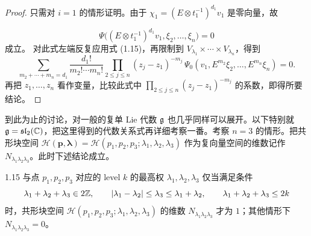 \begin{proof}
只需对 $i=1$ 的情形证明。由于 $\chi_1=(E\otimes t_1^{-1})^{d_1}v_1$ 是零向量，故

\[
  \Psi\bigl((E\otimes t_1^{-1})^{d_1}v_1,\xi_2,\dots,\xi_n\bigr)=0
\]
成立。
对此式左端反复应用式 (1.15)，再限制到 $V_{\lambda_1}\times\cdots\times V_{\lambda_n}$，得到
\[
  \sum_{m_2+\cdots+m_n=d_1}\frac{d_1!}{m_2!\cdots m_n!}
  \prod_{2\le j\le n}(z_j-z_1)^{-m_j}\,
  \Psi_0(v_1,E^{m_2}\xi_2,\dots,E^{m_n}\xi_n)=0 .
\]
再把 $z_1,\dots,z_n$ 看作变量，比较此式中 $\prod_{2\le j\le n}(z_j-z_1)^{-m_j}$ 的系数，即得所要结论。
\end{proof}


到此为止的讨论，对一般的复单 Lie 代数 $\mathfrak{g}$ 也几乎同样可以展开。以下特别就 $\mathfrak{g}=\mathfrak{sl}_2(\mathbb{C})$，把这里得到的代数关系式再详细考察一番。考察 $n=3$ 的情形。把共形块空间 $\mathcal{H}(\bm p,\bm\lambda)=\mathcal{H}(p_1,p_2,p_3;\lambda_1,\lambda_2,\lambda_3)$ 作为复向量空间的维数记作 $N_{\lambda_1\lambda_2\lambda_3}$。此时下述结论成立。

\begin{proposition*}{1.15}
与点 $p_1,p_2,p_3$ 对应的 level $k$ 的最高权 $\lambda_1,\lambda_2,\lambda_3$ 仅当满足条件
\[
  \lambda_1+\lambda_2+\lambda_3\in2\mathbb{Z},\qquad
  |\lambda_1-\lambda_2|\le\lambda_3\le\lambda_1+\lambda_2,\qquad
  \lambda_1+\lambda_2+\lambda_3\le2k
\]
时，共形块空间 $\mathcal{H}(p_1,p_2,p_3;\lambda_1,\lambda_2,\lambda_3)$ 的维数 $N_{\lambda_1\lambda_2\lambda_3}$ 才为 $1$；其他情形下 $N_{\lambda_1\lambda_2\lambda_3}=0$。
\end{proposition*}

